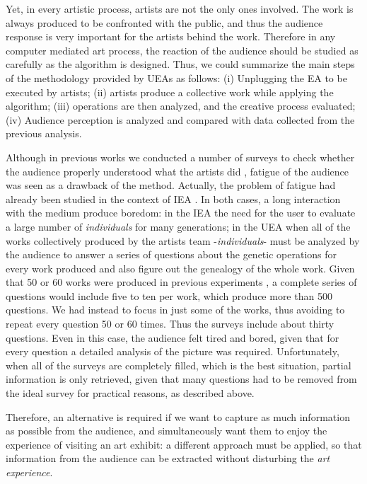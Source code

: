 \documentclass[graybox]{svmult}
\begin{document}
Yet, in every artistic process, artists are not the only ones involved.  The work is always produced to be confronted with the public, and thus the audience response is very important for the artists behind the work. Therefore in any computer mediated art process, the reaction of the audience should be studied as carefully as the algorithm is designed.  Thus, we could summarize the main steps of the methodology provided by UEAs as follows:    (i) Unplugging the EA to be executed by artists; (ii) artists produce a collective work while applying the algorithm;  (iii) operations are then analyzed, and the creative process evaluated;  (iv) Audience perception is analyzed and compared with data collected from the previous analysis.

Although in previous works we conducted a number of surveys to check whether the audience properly understood what the artists did \cite{moreno2016analysing}, fatigue of the audience was seen as a drawback of the method.  Actually, the problem of fatigue had already been studied in the context of IEA \cite{frade2010evolution}.  In both cases, a long interaction with the medium produce boredom:  in the IEA the need for the user to evaluate a large number of \textit{individuals} for many generations;  in the UEA when all of the works collectively produced by the artists team -\textit{individuals}- must be analyzed by the audience to answer a series of questions about the genetic operations for every work produced and also figure out the genealogy of the whole work.  Given that 50 or 60 works were produced in previous experiments \cite{de2013unplugging}, \cite{de2014unplugging} a complete series of questions would include five to ten per work, which produce more than 500 questions.  We had instead to focus in just some of the works, thus avoiding to repeat every question 50 or 60 times.  Thus the surveys include about thirty questions.  Even in this case, the audience felt tired and bored, given that for every question a detailed analysis of the picture was required.  Unfortunately, when all of the surveys are completely filled, which is the best situation, partial information is only retrieved, given that many questions had to be removed from the ideal survey for practical reasons, as described above.

Therefore, an alternative is required if we want to capture as much information as possible from the audience, and simultaneously want them to enjoy the experience of visiting an art exhibit:  a different approach must be applied, so that information from the audience can be extracted without disturbing the \textit{art experience}. 
\end{document}

